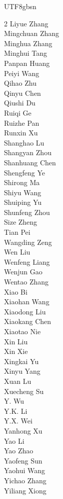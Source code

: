 \documentclass[11pt, a4paper, logo, copyright, nonumbering]{deepseek}
\begin{document}
\begin{CJK*}{UTF8}{gbsn}
\begin{multicols}{2}
Liyue Zhang \\
Mingchuan Zhang \\
Minghua Zhang \\
Minghui Tang \\
Panpan Huang \\
Peiyi Wang \\
Qihao Zhu \\
Qinyu Chen \\
Qiushi Du \\
Ruiqi Ge \\
Ruizhe Pan \\
Runxin Xu \\
Shanghao Lu \\
Shangyan Zhou \\
Shanhuang Chen \\
Shengfeng Ye \\
Shirong Ma \\
Shiyu Wang \\
Shuiping Yu \\
Shunfeng Zhou \\
Size Zheng \\
Tian Pei \\
Wangding Zeng \\
Wen Liu \\
Wenfeng Liang \\
Wenjun Gao \\
Wentao Zhang \\
Xiao Bi \\
Xiaohan Wang \\
Xiaodong Liu \\
Xiaokang Chen \\
Xiaotao Nie \\
Xin Liu \\
Xin Xie \\
Xingkai Yu \\
Xinyu Yang \\
Xuan Lu \\
Xuecheng Su \\
Y. Wu \\
Y.K. Li \\
Y.X. Wei \\
Yanhong Xu \\
Yao Li \\
Yao Zhao \\
Yaofeng Sun \\
Yaohui Wang \\
Yichao Zhang \\
Yiliang Xiong \\

\end{multicols}
\end{CJK*}
\end{document}
